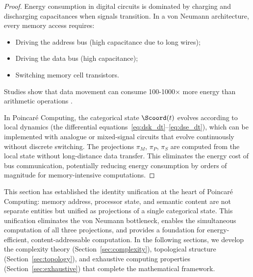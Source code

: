 \begin{proof}
Energy consumption in digital circuits is dominated by charging and discharging capacitances when signals transition. In a von Neumann architecture, every memory access requires:
\begin{itemize}
    \item Driving the address bus (high capacitance due to long wires);
    \item Driving the data bus (high capacitance);
    \item Switching memory cell transistors.
\end{itemize}

Studies show that data movement can consume 100-1000× more energy than arithmetic operations \citep{horowitz2014energy}.

In Poincaré Computing, the categorical state $\Scoord(t)$ evolves according to local dynamics (the differential equations~\eqref{eq:dsk_dt}--\eqref{eq:dse_dt}), which can be implemented with analogue or mixed-signal circuits that evolve continuously without discrete switching. The projections $\pi_M$, $\pi_P$, $\pi_S$ are computed from the local state without long-distance data transfer. This eliminates the energy cost of bus communication, potentially reducing energy consumption by orders of magnitude for memory-intensive computations.
\end{proof}

This section has established the identity unification at the heart of Poincaré Computing: memory address, processor state, and semantic content are not separate entities but unified as projections of a single categorical state. This unification eliminates the von Neumann bottleneck, enables the simultaneous computation of all three projections, and provides a foundation for energy-efficient, content-addressable computation. In the following sections, we develop the complexity theory (Section~\ref{sec:complexity}), topological structure (Section~\ref{sec:topology}), and exhaustive computing properties (Section~\ref{sec:exhaustive}) that complete the mathematical framework.

